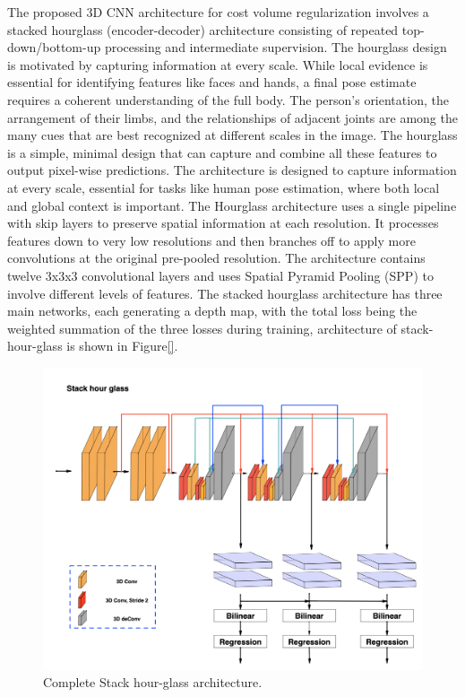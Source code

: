 \documentclass[english, LaM, oneside]{sapthesis}%
\begin{document}
The proposed 3D CNN architecture for cost volume regularization involves a stacked hourglass \cite{stack} (encoder-decoder) architecture consisting of repeated top-down/bottom-up processing and intermediate supervision. The hourglass design is motivated by capturing information at every scale. While local evidence is essential for identifying features like faces and hands, a final pose estimate requires a coherent understanding of the full body. The person’s orientation, the arrangement of their limbs, and the relationships of adjacent joints are among the many cues that are best recognized at different scales in the image. The hourglass is a simple, minimal design that can capture and combine all these features to output pixel-wise predictions. 
The architecture is designed to capture information at every scale, essential for tasks like human pose estimation, where both local and global context is important. The Hourglass architecture uses a single pipeline with skip layers to preserve spatial information at each resolution. It processes features down to very low resolutions and then branches off to apply more convolutions at the original pre-pooled resolution. The architecture contains twelve 3x3x3 convolutional layers and uses Spatial Pyramid Pooling (SPP) to involve different levels of features. The stacked hourglass architecture has three main networks, each generating a depth map, with the total loss being the weighted summation of the three losses during training, architecture of stack-hour-glass is shown in Figure\ref{}.

\begin{figure}[h] 
    \centering
    \includegraphics[width=\linewidth]{Images/stack.png}
    \caption{Complete Stack hour-glass architecture\cite{c16}.}
    \label{fig:ASPP2}
\end{figure}
\end{document}
